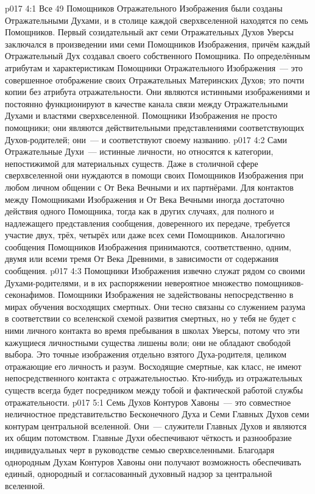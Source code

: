 \vs p017 4:1 Все 49 Помощников Отражательного Изображения были созданы Отражательными Духами, и в столице каждой сверхвселенной находятся по семь Помощников. Первый созидательный акт семи Отражательных Духов Уверсы заключался в произведении ими семи Помощников Изображения, причём каждый Отражательный Дух создавал своего собственного Помощника. По определённым атрибутам и характеристикам Помощники Отражательного Изображения~--- это совершенное отображение своих Отражательных Материнских Духов; это почти копии без атрибута отражательности. Они являются истинными изображениями и постоянно функционируют в качестве канала связи между Отражательными Духами и властями сверхвселенной. Помощники Изображения не просто помощники; они являются действительными представлениями соответствующих Духов\hyp{}родителей; они~---  и соответствуют своему названию.
\vs p017 4:2 Сами Отражательные Духи~--- истинные личности, но относятся к категории, непостижимой для материальных существ. Даже в столичной сфере сверхвселенной они нуждаются в помощи своих Помощников Изображения при любом личном общении с От Века Вечными и их партнёрами. Для контактов между Помощниками Изображения и От Века Вечными иногда достаточно действия одного Помощника, тогда как в других случаях, для полного и надлежащего представления сообщения, доверенного их передаче, требуется участие двух, трёх, четырёх или даже всех семи Помощников. Аналогично сообщения Помощников Изображения принимаются, соответственно, одним, двумя или всеми тремя От Века Древними, в зависимости от содержания сообщения.
\vs p017 4:3 Помощники Изображения извечно служат рядом со своими Духами\hyp{}родителями, и в их распоряжении невероятное множество помощников\hyp{}секонафимов. Помощники Изображения не задействованы непосредственно в мирах обучения восходящих смертных. Они тесно связаны со служением разума в соответствии со вселенской схемой развития смертных, но у тебя не будет с ними личного контакта во время пребывания в школах Уверсы, потому что эти кажущиеся личностными существа лишены воли; они не обладают свободой выбора. Это точные изображения отдельно взятого Духа\hyp{}родителя, целиком отражающие его личность и разум. Восходящие смертные, как класс, не имеют непосредственного контакта с отражательностью. Кто\hyp{}нибудь из отражательных существ всегда будет посредником между тобой и фактической работой службы отражательности.
\vs p017 5:1 Семь Духов Контуров Хавоны~--- это совместное неличностное представительство Бесконечного Духа и Семи Главных Духов семи контурам центральной вселенной. Они~--- служители Главных Духов и являются их общим потомством. Главные Духи обеспечивают чёткость и разнообразие индивидуальных черт в руководстве семью сверхвселенными. Благодаря однородным Духам Контуров Хавоны они получают возможность обеспечивать единый, однородный и согласованный духовный надзор за центральной вселенной.
